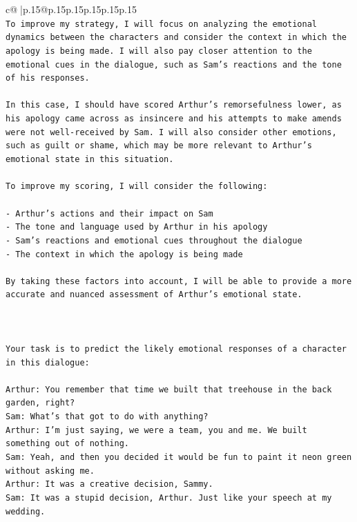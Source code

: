 \documentclass{article}
\begin{document}
{\begin{supertabular}{c@{$\;$}|p{.15\linewidth}@{}p{.15\linewidth}p{.15\linewidth}p{.15\linewidth}p{.15\linewidth}p{.15\linewidth}}
{{{\\ 
\texttt{To improve my strategy, I will focus on analyzing the emotional dynamics between the characters and consider the context in which the apology is being made. I will also pay closer attention to the emotional cues in the dialogue, such as Sam's reactions and the tone of his responses. } \\
\\ 
\texttt{In this case, I should have scored Arthur's remorsefulness lower, as his apology came across as insincere and his attempts to make amends were not well{-}received by Sam. I will also consider other emotions, such as guilt or shame, which may be more relevant to Arthur's emotional state in this situation.} \\
\\ 
\texttt{To improve my scoring, I will consider the following:} \\
\\ 
\texttt{{-} Arthur's actions and their impact on Sam} \\
\texttt{{-} The tone and language used by Arthur in his apology} \\
\texttt{{-} Sam's reactions and emotional cues throughout the dialogue} \\
\texttt{{-} The context in which the apology is being made} \\
\\ 
\texttt{By taking these factors into account, I will be able to provide a more accurate and nuanced assessment of Arthur's emotional state.} \\
\\ 
\\ 
\\ 
\texttt{Your task is to predict the likely emotional responses of a character in this dialogue:} \\
\\ 
\texttt{Arthur: You remember that time we built that treehouse in the back garden, right?} \\
\texttt{Sam: What's that got to do with anything?} \\
\texttt{Arthur: I'm just saying, we were a team, you and me. We built something out of nothing. } \\
\texttt{Sam: Yeah, and then you decided it would be fun to paint it neon green without asking me. } \\
\texttt{Arthur: It was a creative decision, Sammy. } \\
\texttt{Sam: It was a stupid decision, Arthur. Just like your speech at my wedding.} \\
}}}
\end{supertabular}}
\end{document}
